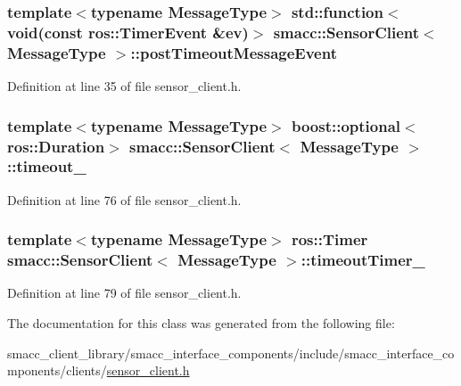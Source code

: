 \subsubsection[{\texorpdfstring{post\+Timeout\+Message\+Event}{postTimeoutMessageEvent}}]{\setlength{\rightskip}{0pt plus 5cm}template$<$typename Message\+Type$>$ std\+::function$<$void(const ros\+::\+Timer\+Event \&ev)$>$ {\bf smacc\+::\+Sensor\+Client}$<$ Message\+Type $>$\+::post\+Timeout\+Message\+Event}\hypertarget{classsmacc_1_1SensorClient_ad2c6d9f2e7ceddac26024cd5901a6739}{}\label{classsmacc_1_1SensorClient_ad2c6d9f2e7ceddac26024cd5901a6739}


Definition at line 35 of file sensor\+\_\+client.\+h.

\subsubsection[{\texorpdfstring{timeout\+\_\+}{timeout_}}]{\setlength{\rightskip}{0pt plus 5cm}template$<$typename Message\+Type$>$ boost\+::optional$<$ros\+::\+Duration$>$ {\bf smacc\+::\+Sensor\+Client}$<$ Message\+Type $>$\+::timeout\+\_\+}\hypertarget{classsmacc_1_1SensorClient_a660452b6940625d3c60581961124ebd8}{}\label{classsmacc_1_1SensorClient_a660452b6940625d3c60581961124ebd8}


Definition at line 76 of file sensor\+\_\+client.\+h.

\subsubsection[{\texorpdfstring{timeout\+Timer\+\_\+}{timeoutTimer_}}]{\setlength{\rightskip}{0pt plus 5cm}template$<$typename Message\+Type$>$ ros\+::\+Timer {\bf smacc\+::\+Sensor\+Client}$<$ Message\+Type $>$\+::timeout\+Timer\+\_\+\hspace{0.3cm}{\ttfamily [private]}}\hypertarget{classsmacc_1_1SensorClient_a5a82e2fa1f0ccfe2564125fae2f9783a}{}\label{classsmacc_1_1SensorClient_a5a82e2fa1f0ccfe2564125fae2f9783a}


Definition at line 79 of file sensor\+\_\+client.\+h.



The documentation for this class was generated from the following file\+:\begin{DoxyCompactItemize}
\item 
smacc\+\_\+client\+\_\+library/smacc\+\_\+interface\+\_\+components/include/smacc\+\_\+interface\+\_\+components/clients/\hyperlink{sensor__client_8h}{sensor\+\_\+client.\+h}\end{DoxyCompactItemize}
